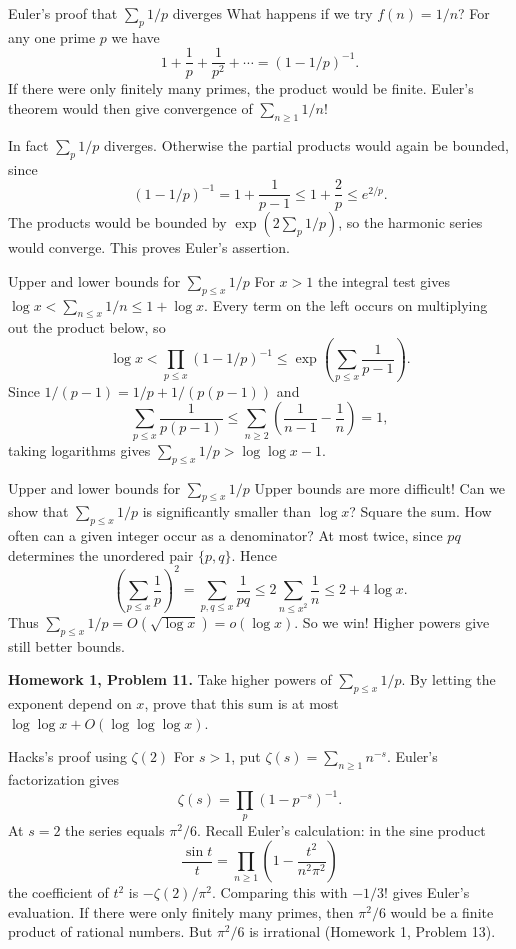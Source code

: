 \documentclass[aspectratio=169,11pt]{beamer}
\newcommand{\HW}[2]{{\color{teal}\textbf{Homework #1, Problem #2.}}}
\begin{document}
\begin{frame}{Euler's proof that $\sum_p1/p$ diverges}
What happens if we try $f(n)=1/n$? For any one prime $p$ we have
\[1+\frac1p+\frac1{p^2}+\cdots=(1-1/p)^{-1}.\]
If there were only finitely many primes, the product would be finite. Euler's theorem would then give convergence of $\sum_{n\ge1}1/n$!

In fact $\sum_p1/p$ diverges. Otherwise the partial products would again be bounded, since
\[(1-1/p)^{-1}=1+\frac1{p-1}\le1+\frac2p\le e^{2/p}.\]
The products would be bounded by $\exp(2\sum_p1/p)$, so the harmonic series would converge. This proves Euler's assertion.
\end{frame}
\begin{frame}{Upper and lower bounds for $\sum_{p\le x}1/p$}
For $x>1$ the integral test gives $\log x<\sum_{n\le x}1/n\le1+\log x$. Every term on the left occurs on multiplying out the product below, so
\[\log x<\prod_{p\le x}(1-1/p)^{-1}\le\exp\left(\sum_{p\le x}\frac1{p-1}\right).\]
Since $1/(p-1)=1/p+1/(p(p-1))$ and
\[\sum_{p\le x}\frac1{p(p-1)}\le\sum_{n\ge2}\left(\frac1{n-1}-\frac1n\right)=1,\]
taking logarithms gives $\sum_{p\le x}1/p>\log\log x-1$.
\end{frame}
\begin{frame}{Upper and lower bounds for $\sum_{p\le x}1/p$}
Upper bounds are more difficult! Can we show that $\sum_{p\le x}1/p$ is significantly smaller than $\log x$? Square the sum. How often can a given integer occur as a denominator? At most twice, since $pq$ determines the unordered pair $\{p,q\}$. Hence
\[\left(\sum_{p\le x}\frac1p\right)^2=\sum_{p,q\le x}\frac1{pq}\le2\sum_{n\le x^2}\frac1n\le2+4\log x.\]
Thus $\sum_{p\le x}1/p=O(\sqrt{\log x})=o(\log x)$. So we win! Higher powers give still better bounds.

\HW{1}{11} Take higher powers of $\sum_{p\le x}1/p$. By letting the exponent depend on $x$, prove that this sum is at most $\log\log x+O(\log\log\log x)$.
\end{frame}
\begin{frame}{Hacks's proof using $\zeta(2)$}
For $s>1$, put $\zeta(s)=\sum_{n\ge1}n^{-s}$. Euler's factorization gives
\[\zeta(s)=\prod_p(1-p^{-s})^{-1}.\]
At $s=2$ the series equals $\pi^2/6$. Recall Euler's calculation: in the sine product
\[\frac{\sin t}t=\prod_{n\ge1}\left(1-\frac{t^2}{n^2\pi^2}\right)\]
the coefficient of $t^2$ is $-\zeta(2)/\pi^2$. Comparing this with $-1/3!$ gives Euler's evaluation. If there were only finitely many primes, then $\pi^2/6$ would be a finite product of rational numbers. But $\pi^2/6$ is irrational (Homework 1, Problem 13).
\end{frame}
\end{document}
